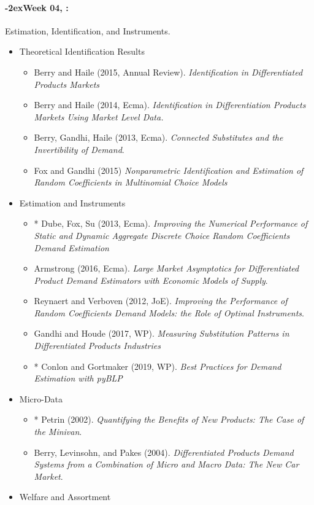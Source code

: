 \documentclass[11pt]{article}
\newcommand{\week}[1]{%
  \paragraph*{\kern-2ex\quad #1, \syldate{\today}:}%
  \ifdim\wd1=\wd\THURSDAY
    \AdvanceDate[7]
  \else
    \AdvanceDate[7]
  \fi%
}
\begin{document}
\week{Week 04} Estimation, Identification, and Instruments.
\begin{itemize}
\item Theoretical Identification Results
\begin{itemize}
\item Berry and Haile (2015, Annual Review). \textit{Identification in Differentiated Products Markets}
\item Berry and Haile (2014, Ecma). \textit{Identification in Differentiation Products Markets Using Market Level Data.}
\item Berry, Gandhi, Haile (2013, Ecma). \textit{Connected Substitutes and the Invertibility of Demand}.
\item Fox and Gandhi (2015) \textit{Nonparametric Identification and Estimation of Random Coefficients in Multinomial Choice Models}
\end{itemize}
\item Estimation and Instruments
\begin{itemize}
\item * Dube, Fox, Su (2013, Ecma). \textit{Improving the Numerical Performance of Static and Dynamic Aggregate Discrete Choice Random Coefficients Demand Estimation}
\item Armstrong (2016, Ecma). \textit{Large Market Asymptotics for Differentiated Product Demand Estimators with Economic Models of Supply}.
\item Reynaert and Verboven (2012, JoE). \textit{Improving the Performance of Random Coefficients Demand Models: the Role of Optimal Instruments}.
\item Gandhi and Houde (2017, WP). \textit{Measuring Substitution Patterns in Differentiated Products Industries}
\item * Conlon and Gortmaker (2019, WP). \textit{Best Practices for Demand Estimation with pyBLP}
\end{itemize}
\item Micro-Data
\begin{itemize}
\item * Petrin (2002). \textit{Quantifying the Benefits of New Products: The Case of the Minivan}.
\item Berry, Levinsohn, and Pakes (2004). \textit{Differentiated Products Demand Systems from a Combination of Micro and Macro Data: The New Car Market}.
\end{itemize}
\item Welfare and Assortment
\begin{itemize}

\end{itemize}
\end{itemize}
\end{document}
